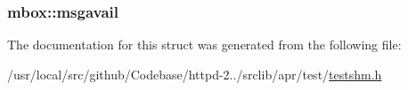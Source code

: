 \subsubsection[{\texorpdfstring{msgavail}{msgavail}}]{ mbox\+::msgavail}\hypertarget{structmbox_ae67643a32ec75158e9f1ffd7f7e0906f}{}\label{structmbox_ae67643a32ec75158e9f1ffd7f7e0906f}


The documentation for this struct was generated from the following file\+:\begin{DoxyCompactItemize}
\item 
/usr/local/src/github/\+Codebase/httpd-\/2../srclib/apr/test/\hyperlink{testshm_8h}{testshm.\+h}\end{DoxyCompactItemize}
